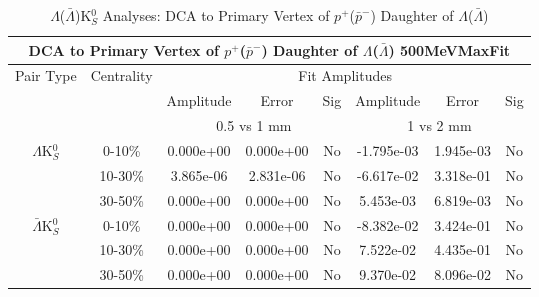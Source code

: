 \documentclass[../AnalysisNoteJBuxton.tex]{subfiles}
\begin{document}
\begin{table}
 \centering
 \begin{tabular}{|c|c|c|c|c||c|c|c|}
  \multicolumn{8}{c}{DCA to Primary Vertex of $p^{+}$($\bar{p}^{-}$) Daughter of $\Lambda$($\bar{\Lambda}$) 500MeVMaxFit} \\
  \hline
  \multirow{3}{*}{Pair Type} & \multirow{3}{*}{Centrality} & \multicolumn{6}{c|}{Fit Amplitudes} \\
  \cline{3-8}
   & & Amplitude & Error & Sig & Amplitude & Error & Sig \\  
  \cline{3-8}
   & & \multicolumn{3}{c||}{0.5 vs 1 mm} & \multicolumn{3}{c|}{1 vs 2 mm} \\  
  \hline  
  \multirow{3}{*}{$\Lambda$K$^{0}_{S}$}  
   &  0-10\% & 0.000e+00 & 0.000e+00 & No & -1.795e-03 & 1.945e-03 & No \\
   & 10-30\% & 3.865e-06 & 2.831e-06 & No & -6.617e-02 & 3.318e-01 & No \\
   & 30-50\% & 0.000e+00 & 0.000e+00 & No & 5.453e-03 & 6.819e-03 & No \\
  \hline  
  \multirow{3}{*}{$\bar{\Lambda}$K$^{0}_{S}$}  
   &  0-10\% & 0.000e+00 & 0.000e+00 & No & -8.382e-02 & 3.424e-01 & No \\
   & 10-30\% & 0.000e+00 & 0.000e+00 & No & 7.522e-02 & 4.435e-01 & No \\
   & 30-50\% & 0.000e+00 & 0.000e+00 & No & 9.370e-02 & 8.096e-02 & No \\
  \hline
 \end{tabular}
 \caption{$\Lambda$($\bar{\Lambda}$)K$^{0}_{S}$ Analyses: DCA to Primary Vertex of $p^{+}$($\bar{p}^{-}$) Daughter of $\Lambda$($\bar{\Lambda}$)}
 \label{tab:DcaToPrimVertexProtonDaughtOfLamLamK0_500MeVMaxFit}
\end{table}
\end{document}
